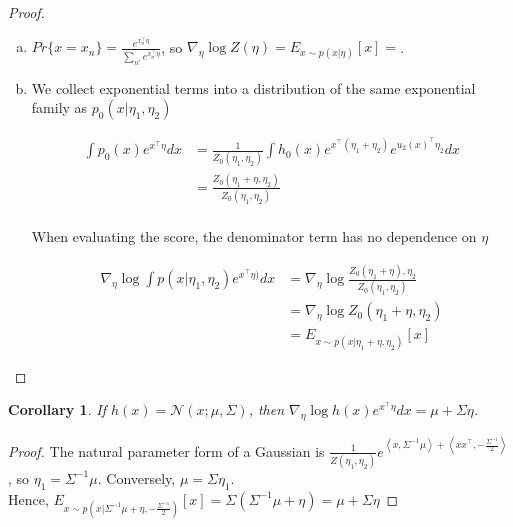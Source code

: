 \documentclass{article}
\newtheorem{corollary}{Corollary}
\begin{document}
\begin{proof}
  \begin{enumerate}[(a)]
    \item $Pr \{ x = x_n \} = \frac{ e^{ x_n^\intercal \eta} }{ \sum_{n'} e^{x_{n'}^\intercal \eta } }$, so $\nabla_\eta \log Z(\eta) = E_{x \sim p( x \vert \eta) } \left[ x \right] = $. \\
    \item We collect exponential terms into a distribution of the same exponential family as $p_0(x \vert \eta_1,\eta_2)$

  \begin{equation}
    \begin{split}
      \int p_0(x) e^{ x^\intercal \eta} dx 
        &= \frac{1}{Z_0(\eta_1,\eta_2)} \int h_0(x) e^{ x^\intercal ( \eta_1 + \eta_2) } e^{u_2(x)^\intercal \eta_2} dx\\
      &= \frac{Z_0(\eta_1+\eta,\eta_2)}{Z_0(\eta_1,\eta_2)} \\
    \end{split}
    \label{}
  \end{equation}

  When evaluating the score, the denominator term has no dependence on $\eta$

  \begin{equation}
    \begin{split}
      \nabla_\eta \log \int p(x \vert \eta_1,\eta_2) e^{ x^\intercal \eta)} dx
	&= \nabla_\eta \log \frac{Z_0(\eta_1+\eta),\eta_2}{Z_0(\eta_1,\eta_2)} \\
      &= \nabla_\eta \log Z_0( \eta_1 + \eta,\eta_2) \\
      &= E_{ x \sim p( x \vert \eta_1 + \eta, \eta_2)} \left[ x \right]
    \end{split}
  \end{equation} 
  \end{enumerate}
\end{proof}

\begin{corollary}
  If $h(x) = \mathcal{N}( x; \mu,\Sigma)$, then $\nabla_\eta \log h(x) e^{ x^\intercal \eta} dx = \mu + \Sigma \eta$.
\end{corollary}

\begin{proof}
  The natural parameter form of a Gaussian is $\frac{1}{Z(\eta_1,\eta_2)} e^{ \left< x, \Sigma^{-1} \mu \right> + \left< x x^\intercal, - \frac{\Sigma^{-1}}{2}\right>}$, so $\eta_1 = \Sigma^{-1} \mu$. Conversely, $\mu = \Sigma \eta_1$. \\
  Hence, $E_{ x \sim p( x \vert \Sigma^{-1} \mu + \eta, - \frac{\Sigma^{-1}}{2}) } \left[ x \right] = \Sigma ( \Sigma^{-1} \mu + \eta ) = \mu + \Sigma \eta$
\end{proof}
\end{document}
